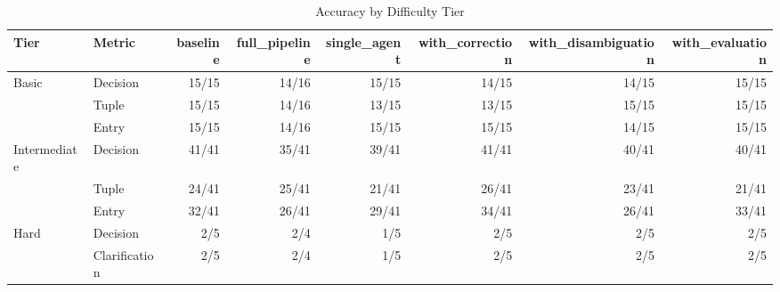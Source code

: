 \begin{table}[htbp]
\centering
\caption{Accuracy by Difficulty Tier}
\label{tab:tier-breakdown}
\begin{tabular}{ll rrrrrr}
\toprule
Tier & Metric & baseline & full\_pipeline & single\_agent & with\_correction & with\_disambiguation & with\_evaluation \\
\midrule
  Basic & Decision & 15/15 & 14/16 & 15/15 & 14/15 & 14/15 & 15/15 \\
   & Tuple & 15/15 & 14/16 & 13/15 & 13/15 & 15/15 & 15/15 \\
   & Entry & 15/15 & 14/16 & 15/15 & 15/15 & 14/15 & 15/15 \\
  \midrule
  Intermediate & Decision & 41/41 & 35/41 & 39/41 & 41/41 & 40/41 & 40/41 \\
   & Tuple & 24/41 & 25/41 & 21/41 & 26/41 & 23/41 & 21/41 \\
   & Entry & 32/41 & 26/41 & 29/41 & 34/41 & 26/41 & 33/41 \\
  \midrule
  Hard & Decision & 2/5 & 2/4 & 1/5 & 2/5 & 2/5 & 2/5 \\
   & Clarification & 2/5 & 2/4 & 1/5 & 2/5 & 2/5 & 2/5 \\
\bottomrule
\end{tabular}
\end{table}
